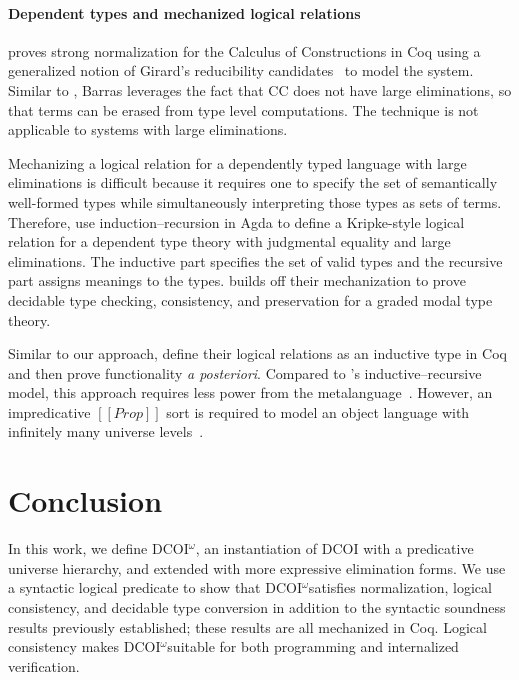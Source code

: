 \documentclass[acmsmall, screen=true, nonacm=true,
  review=\ifpublic false\else true\fi,
  anonymous=\ifanonymous true\else false\fi
]{acmart}
\makeatletter
\newcommand{\sw}[1]{}
\newcommand{\jc}[1]{}
\newcommand{\dcoi}{DCOI\@\xspace}
\newcommand{\name}{\texorpdfstring{DCOI$^{\omega}$\@\xspace}{DCOI-omega}}
\newcommand{\aposteriori}{\textit{a posteriori}\@\xspace}
\makeatother
\begin{document}
\paragraph{Dependent types and mechanized logical relations}
\citet{barras:coq-coq} proves strong normalization for the Calculus of
Constructions in Coq using  a generalized
notion of Girard's reducibility candidates~\citep{girard:proofs} 
to model the system. Similar to \citet{geuvers:cc-sn}, Barras
leverages the fact that CC does not have large eliminations, so
that terms can be erased from type level computations.
The technique is not applicable to systems with large eliminations. %

Mechanizing a logical relation for a dependently typed language with large
eliminations is difficult because it requires one to specify the set of
semantically well-formed types while simultaneously interpreting those
types as sets of terms.
Therefore, \citet{abel:dectt} use induction--recursion in Agda to define a Kripke-style
logical relation for a dependent type theory with judgmental equality and
large eliminations. The inductive part specifies the set of valid types and
the recursive part assigns meanings to the types. \citet{abel:grade} builds
off their mechanization to prove decidable type checking, consistency, and
preservation for a graded modal type theory.

Similar to our approach, \citet{anand:corenuprl,
wieczorek:coqnbe, adjedj:mltt-coq} define their logical relations
as an inductive type in Coq and then prove functionality \aposteriori. 
Compared to \citet{abel:dectt}'s
inductive--recursive model, this approach requires less power from the
metalanguage~\citep{adjedj:mltt-coq}. However, an impredicative
$[[Prop]]$ sort is required to model an object language with infinitely
many universe levels~\citep{anand:corenuprl}.

\section{Conclusion}

In this work, we define \name, an instantiation of \dcoi with a
predicative universe hierarchy, and extended with more expressive
elimination forms. We use a syntactic logical predicate to show that
\name satisfies normalization, logical consistency, and decidable type
conversion in addition to the syntactic soundness results previously established; these results are all mechanized in Coq.
Logical consistency makes \name suitable for both
programming and internalized verification.
\jc{I don't think logical consistency says anything about programming
and we probably shouldn't mention information flow
if all of our examples have been about irrelevance?}
\sw{I removed information flow, but I'd like to get a hint of trellys
style termination modalities here...}
\end{document}
